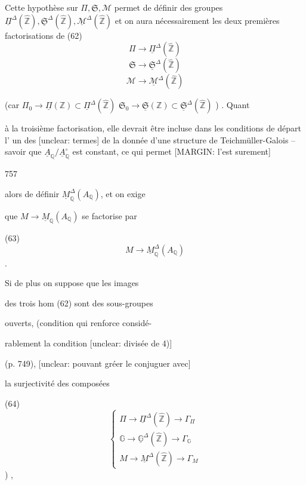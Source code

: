 Cette hypothèse sur $\Pi, \mathfrak{S}, \mathcal{M}$ permet de
définir des groupes $\underline{\Pi}^{\Delta}(\hat{\mathbb{Z}}), \underline{\mathfrak{S}}^{\Delta}(\hat{\mathbb{Z}}), \underline{\mathcal{M}}^{\Delta}(\hat{\mathbb{Z}})$
et on aura nécessairement les deux premières
factorisations de
(62)
$$ \Pi \to \underline{\Pi}^{\Delta}(\hat{\mathbb{Z}}) $$
$$ \mathfrak{S} \to \underline{\mathfrak{S}}^{\Delta}(\hat{\mathbb{Z}}) $$
$$ \mathcal{M} \to \underline{\mathcal{M}}^{\Delta}(\hat{\mathbb{Z}}) $$

(car $\Pi_0 \to \underline{\Pi}(\mathbb{Z}) \subset \underline{\Pi}^{\Delta}(\hat{\mathbb{Z}})$
$\mathfrak{S}_0 \to \underline{\mathfrak{S}}(\mathbb{Z}) \subset \underline{\mathfrak{S}}^{\Delta}(\hat{\mathbb{Z}})$ ) . Quant

à la troisième factorisation, elle devrait être
incluse dans les conditions de départ l'
un des [unclear: termes] de la donnée d'une structure de
Teichmüller-Galois -- savoir que
$\underline{A}_{\mathbb{Q}} / \underline{A}_{\mathbb{Q}}^\circ$ est constant, ce qui permet
[MARGIN: l'est surement]

\newpage


757

alors de définir $\underline{M}^\Delta_{\mathbb{Q}}(A_{\mathbb{Q}})$, et on exige

que $M \to \underline{M}_{\mathbb{Q}}(A_{\mathbb{Q}})$ se factorise par

(63) $$M \to \underline{M}^\Delta_{\mathbb{Q}}(A_{\mathbb{Q}})$$ .

Si de plus on suppose que les images

des trois hom (62) sont des sous-groupes

ouverts, (condition qui renforce considé-

rablement la condition [unclear: divisée de 4)]

(p. 749), [unclear: pouvant gréer le conjuguer avec]

la surjectivité des composées

(64)
$$ \begin{cases}
\Pi \to \underline{\Pi}^\Delta(\hat{\mathbb{Z}}) \to \Gamma_{\Pi} \\
\mathbb{G} \to \underline{\mathbb{G}}^\Delta(\hat{\mathbb{Z}}) \to \Gamma_{\mathbb{G}} \\
M \to \underline{M}^\Delta(\hat{\mathbb{Z}}) \to \Gamma_M
\end{cases} $$
) ,

